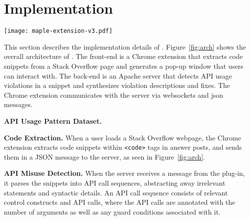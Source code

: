 \section{Implementation}
\label{sec:implementation}

\begin{figure*}[!th]
\centering
\texttt{[image: maple-extension-v3.pdf]}
\vspace{.1in}
\caption{An overview of {\tool}'s architecture}
\label{fig:arch}
\end{figure*}

This section describes the implementation details of {\tool}. Figure~\ref{fig:arch} shows the overall architecture of {\tool}. The front-end is a Chrome extension that extracts code snippets from a Stack Overflow page and generates a pop-up window that users can interact with. The back-end is an Apache server that detects API usage violations in a snippet and synthesizes violation descriptions and fixes. The Chrome extension communicates with the server via websockets and json messages. 

{\bf API Usage Pattern Dataset.} 

{\bf Code Extraction.} When a user loads a Stack Overflow webpage, the Chrome extension extracts code snippets within {\tt <code>} tags in answer posts, and sends them in a JSON message to the server, as seen in Figure~\ref{fig:arch}.

{\bf API Misuse Detection.} When the server receives a message from the plug-in, it parses the snippets into API call sequences, abstracting away irrelevant statements and syntactic details. An API call sequence consists of relevant control constructs and API calls, where the API calls are annotated with the number of arguments as well as any guard conditions associated with it.

